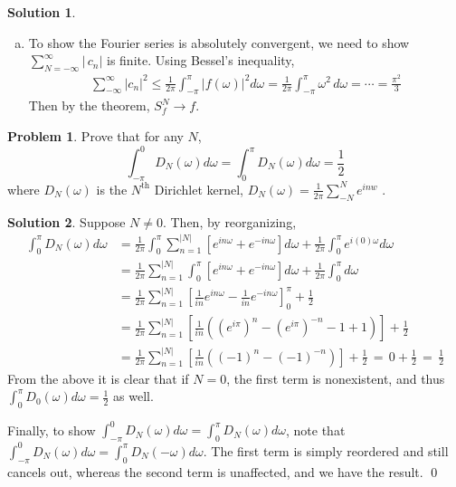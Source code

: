\documentclass[10pt]{article}
\theoremstyle{plain}
\theoremstyle{definition}
\newtheorem{prob}{Problem}
\newtheorem*{soln*}{Solution}
\numberwithin{equation}{section}
\begin{document}
\begin{soln*}
\begin{enumerate}[(a)]
        \item
            To show the Fourier series is absolutely convergent, we need to show
            $\displaystyle \sum_{N=-\infty}^\infty \left|\,{c_n} \right|$ is finite. 
            Using Bessel's inequality,
            \begin{align*}
                \sum_{-\infty}^{\infty}|c_n|^2
                    \leq \frac{1}{2\pi} \int_{-\pi}^{\pi} | f(\omega) |^2 d\omega
                    =\frac{1}{2\pi} \int_{-\pi}^{\pi} \omega^2 \,d\omega = \cdots = \frac{\pi^2}{3}
                \end{align*}
            Then by the theorem, $S_f^N \rightarrow f$.
    \end{enumerate}
\end{soln*}

\hrulefill

\begin{prob}
    Prove that for any $N$,
    \[
            \int_{-\pi}^0  D_N(\omega) d\omega
        =   \int_{0}^{\pi}  D_N(\omega) d\omega = \frac{1}{2}
    \]
    where $D_N(\omega)$ is the $N^{\text{th}}$ Dirichlet kernel,
    $\displaystyle D_N(\omega) = \frac{1}{2\pi}\sum_{-N}^N e^{inw}$\,\,.
\end{prob}
\begin{soln*}
    Suppose $N\neq 0$. Then, by reorganizing,
    \begin{align*}
        \int_0^\pi D_N(\omega)d\omega &=
        \frac{1}{2\pi} \int_0^\pi \sum_{n=1}^{|N|}\left[
        e^{in\omega} + e^{-in\omega}\right] d\omega + \frac{1}{2\pi}\int_0^\pi e^{i(0)\omega} d\omega \\
        &= \frac{1}{2\pi} \sum_{n=1}^{|N|}\int_0^\pi \left[
        e^{in\omega} + e^{-in\omega}\right] d\omega + \frac{1}{2\pi}\int_0^\pi d\omega \\
        &= \frac{1}{2\pi} \sum_{n=1}^{|N|}
            \left[ \frac{1}{in} e^{in\omega} -\frac{1}{in} e^{-in\omega}\right]_0^\pi
            + \frac{1}{2} \\ 
        &= \frac{1}{2\pi} \sum_{n=1}^{|N|}
            \left[ \frac{1}{in}\left(
            \left(e^{i\pi}\right)^n - \left(e^{i\pi}\right)^{-n} - 1 + 1
        \right)\right] + \frac{1}{2}\\
        &= \frac{1}{2\pi} \sum_{n=1}^{|N|}
        \left[ \frac{1}{in}\left( (-1)^n - (-1)^{-n}\right)\right] + \frac{1}{2} 
        \,=\, 0 + \frac{1}{2} \,=\, \frac{1}{2}
    \end{align*}
    From the above it is clear that if $N=0$, the first term is nonexistent, and thus
    $\int_0^\pi D_0(\omega) d\omega = \frac{1}{2}$ as well.

    Finally, to show $\int_{-\pi}^0  D_N(\omega) d\omega =   \int_{0}^{\pi}  D_N(\omega) d\omega$,
    note that $\int_{-\pi}^{0} D_N(\omega) d\omega = \int_0^\pi D_N(-\omega) d\omega$.
    The first term is simply reordered and still cancels out, whereas the second term is unaffected,
    and we have the result.
    \qed
\end{soln*}
\end{document}
